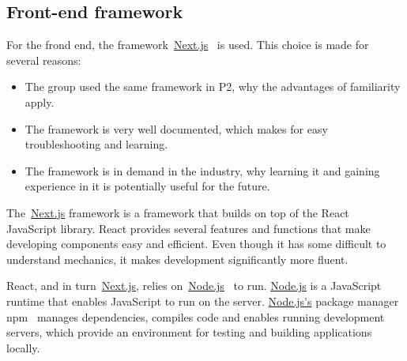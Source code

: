 \subsection{Front-end framework}\label{subsec:front-end-framework}

For the frond end, the framework~\url{Next.js}~\cite{next2024} is used.
This choice is made for several reasons:

\begin{itemize}
    \item The group used the same framework in P2, why the advantages of familiarity apply.

    \item The framework is very well documented, which makes for easy troubleshooting and learning.

    \item The framework is in demand in the industry, why learning it and gaining experience in it is potentially useful
    for the future.
\end{itemize}

The~\url{Next.js} framework is a framework that builds on top of the React~\cite{react2024} JavaScript library.
React provides several features and functions that make developing components easy and efficient.
Even though it has some difficult to understand mechanics, it makes development significantly more fluent.

React, and in turn~\url{Next.js}, relies on~\url{Node.js}~\cite{node2024} to run.
\url{Node.js} is a JavaScript runtime that enables JavaScript to run on the server.
\url{Node.js's} package manager npm~\cite{npm2024} manages dependencies, compiles code and enables running
development servers, which provide an environment for testing and building applications locally.
